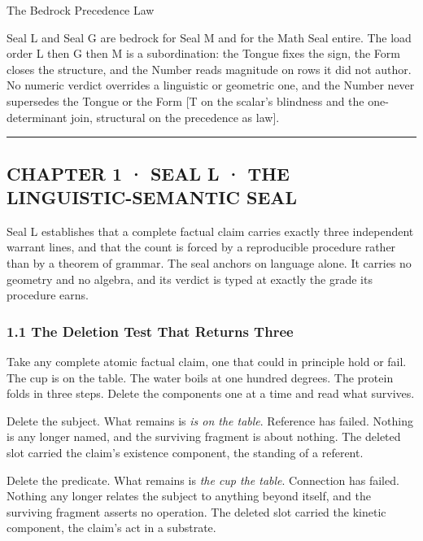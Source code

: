 \documentclass[10pt,twocolumn]{article}
\begin{document}
\begin{jbox}{The Bedrock Precedence Law}

Seal L and Seal G are bedrock for Seal M and for the Math Seal entire.
The load order L then G then M is a subordination: the Tongue fixes the
sign, the Form closes the structure, and the Number reads magnitude on
rows it did not author. No numeric verdict overrides a linguistic or
geometric one, and the Number never supersedes the Tongue or the Form
{[}T on the scalar's blindness and the one-determinant join, structural
on the precedence as law{]}.

\end{jbox}

\begin{center}\rule{0.5\linewidth}{0.5pt}\end{center}

\hypertarget{chapter-1-seal-l-the-linguistic-semantic-seal}{%
\subsection{CHAPTER 1 · SEAL L · THE LINGUISTIC-SEMANTIC
SEAL}\label{chapter-1-seal-l-the-linguistic-semantic-seal}}

Seal L establishes that a complete factual claim carries exactly three
independent warrant lines, and that the count is forced by a
reproducible procedure rather than by a theorem of grammar. The seal
anchors on language alone. It carries no geometry and no algebra, and
its verdict is typed at exactly the grade its procedure earns.

\hypertarget{the-deletion-test-that-returns-three}{%
\subsubsection{1.1 The Deletion Test That Returns
Three}\label{the-deletion-test-that-returns-three}}

Take any complete atomic factual claim, one that could in principle hold
or fail. The cup is on the table. The water boils at one hundred
degrees. The protein folds in three steps. Delete the components one at
a time and read what survives.

Delete the subject. What remains is \emph{is on the table}. Reference
has failed. Nothing is any longer named, and the surviving fragment is
about nothing. The deleted slot carried the claim's existence component,
the standing of a referent.

Delete the predicate. What remains is \emph{the cup the table}.
Connection has failed. Nothing any longer relates the subject to
anything beyond itself, and the surviving fragment asserts no operation.
The deleted slot carried the kinetic component, the claim's act in a
substrate.
\end{document}
